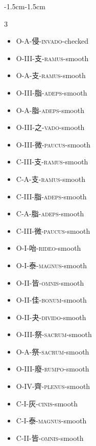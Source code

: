\begin{adjustwidth}{-1.5cm}{-1.5cm}
\begin{multicols}{3}
\begin{itemize}[label={}, leftmargin=*]
  \item O-A-侵-\textsc{invado}-checked \hfill {}
  \item O-III-支-\textsc{ramus}-smooth \hfill {}
  \item O-A-支-\textsc{ramus}-smooth \hfill {}
  \item O-III-脂-\textsc{adeps}-smooth \hfill {}

  \item O-A-脂-\textsc{adeps}-smooth \hfill {}
  \item O-III-之-\textsc{vado}-smooth \hfill {}
  \item O-III-微-\textsc{paucus}-smooth \hfill {}
  \item C-III-支-\textsc{ramus}-smooth \hfill {}

  \item C-A-支-\textsc{ramus}-smooth \hfill {}
  \item C-III-脂-\textsc{adeps}-smooth \hfill {}
  \item C-A-脂-\textsc{adeps}-smooth \hfill {}
  \item C-III-微-\textsc{paucus}-smooth \hfill {}

  \item O-I-咍-\textsc{rideo}-smooth \hfill {}
  \item O-I-泰-\textsc{magnus}-smooth \hfill {}
  \item O-II-皆-\textsc{omnis}-smooth \hfill {}
  \item O-II-佳-\textsc{bonum}-smooth \hfill {}

  \item O-II-夬-\textsc{divido}-smooth \hfill {}
  \item O-III-祭-\textsc{sacrum}-smooth \hfill {}
  \item O-A-祭-\textsc{sacrum}-smooth \hfill {}
  \item O-III-廢-\textsc{rumpo}-smooth \hfill {}

  \item O-IV-齊-\textsc{plenus}-smooth \hfill {}
  \item C-I-灰-\textsc{cinis}-smooth \hfill {}
  \item C-I-泰-\textsc{magnus}-smooth \hfill {}
  \item C-II-皆-\textsc{omnis}-smooth \hfill {}


\end{itemize}
\end{multicols}
\end{adjustwidth}
